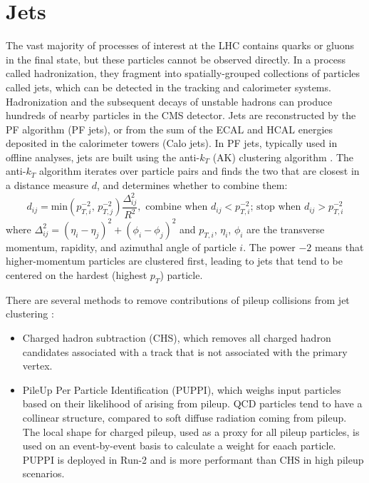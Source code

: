 \section{Jets}
The vast majority of processes of interest at the LHC contains quarks or gluons in the final state, but these particles cannot be observed directly. In a process called hadronization, they fragment into spatially-grouped collections of particles called jets, which can be detected in the tracking and calorimeter systems. Hadronization and the subsequent decays of unstable hadrons can produce hundreds of nearby particles in the CMS detector. Jets are reconstructed by the PF algorithm (PF jets), or from the sum of the ECAL and HCAL energies deposited in the calorimeter towers (Calo jets). In PF jets, typically used in offline analyses, jets are built using the anti-$k_T$ (AK) clustering algorithm \cite{CMS-BTV-12-001}. The anti-$k_T$ algorithm iterates over particle pairs and finds the two that are closest in a distance measure $d$, and determines whether to combine them:
\begin{equation}
    d_{ij} = \text{min} \left(p_{T, i}^{-2}, \, p_{T, j}^{-2} \right) \frac{\Delta_{ij}^2}{R^2}, \, \,
    \text{combine when $d_{ij} < p_{T,i}^{-2}$; stop when $d_{ij} > p_{T, i}^{-2}$}
    \label{eqn:anti-kT}
\end{equation}
where $\Delta_{ij}^2 = (\eta_i - \eta_j)^2 + (\phi_i - \phi_j)^2$ and $p_{T, i}$, $\eta_i$, $\phi_i$ are the transverse momentum, rapidity, and azimuthal angle of particle $i$. The power $-2$ means that higher-momentum particles are clustered first, leading to jets that tend to be centered on the hardest (highest $p_T$) particle.

There are several methods to remove contributions of pileup collisions from jet clustering \cite{CMS-PAS-JME-14-001}:
\begin{itemize}
    \item Charged hadron subtraction (CHS), which removes all charged hadron candidates associated with a track that is not associated with the primary vertex.
    \item PileUp Per Particle Identification (PUPPI), which weighs input particles based on their likelihood of arising from pileup. QCD particles tend to have a collinear structure, compared to soft diffuse radiation coming from pileup. The local shape for charged pileup, used as a proxy for all pileup particles, is used on an event-by-event basis to calculate a weight for eaach particle. PUPPI is deployed in Run-2 and is more performant than CHS in high pileup scenarios.
\end{itemize}


